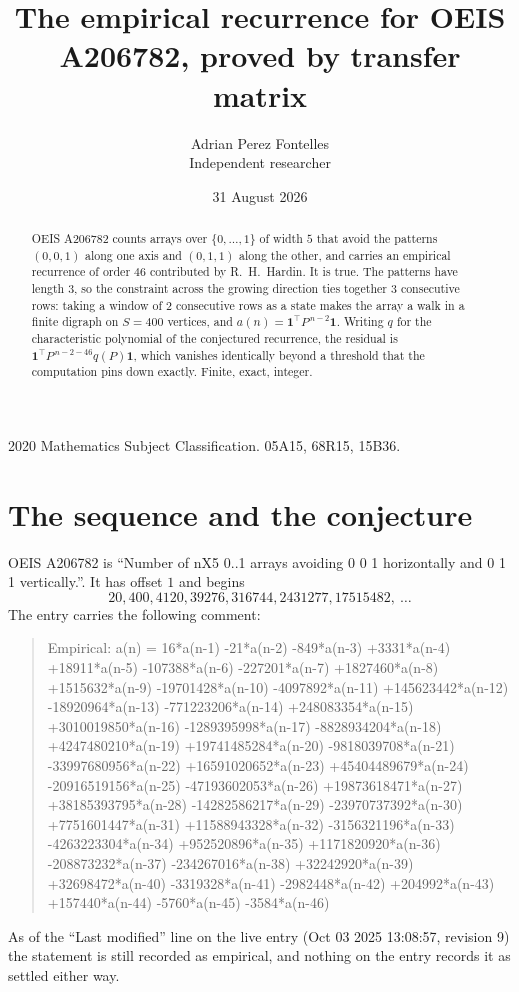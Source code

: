 \documentclass[11pt,a4paper]{article}
\title{The empirical recurrence for OEIS A206782, proved by transfer matrix}
\author{Adrian Perez Fontelles\\ \small Independent researcher}
\date{31 August 2026}
\theoremstyle{plain}
\theoremstyle{definition}
\begin{document}
\maketitle

\begin{abstract}
OEIS A206782 counts arrays over $\{0,\dots,1\}$ of width $5$ that avoid the patterns
$(0,0,1)$ along one axis and $(0,1,1)$ along the other, and carries an empirical recurrence of
order $46$ contributed by R.~H.~Hardin. It is true. The patterns have length $3$, so
the constraint across the growing direction ties together $3$ consecutive rows: taking a
window of $2$ consecutive rows as a state makes the array a walk in a finite digraph
on $S=400$ vertices, and $a(n)=\mathbf{1}^{\!\top}P^{\,n-2}\mathbf{1}$. Writing $q$
for the characteristic polynomial of the conjectured recurrence, the residual is
$\mathbf{1}^{\!\top}P^{\,n-2-46}q(P)\mathbf{1}$, which vanishes identically
beyond a threshold that the computation pins down exactly. Finite, exact, integer.
\end{abstract}

\noindent\small 2020 Mathematics Subject Classification. 05A15, 68R15, 15B36.\normalsize

\section{The sequence and the conjecture}

OEIS A206782 is ``Number of nX5 0..1 arrays avoiding 0 0 1 horizontally and 0 1 1 vertically.''. It has offset
$1$ and begins
\[
20, 400, 4120, 39276, 316744, 2431277, 17515482,\ \dots
\]
The entry carries the following comment:
\begin{quote}\small
Empirical: a(n) = 16*a(n-1) -21*a(n-2) -849*a(n-3) +3331*a(n-4) +18911*a(n-5) -107388*a(n-6) -227201*a(n-7) +1827460*a(n-8) +1515632*a(n-9) -19701428*a(n-10) -4097892*a(n-11) +145623442*a(n-12) -18920964*a(n-13) -771223206*a(n-14) +248083354*a(n-15) +3010019850*a(n-16) -1289395998*a(n-17) -8828934204*a(n-18) +4247480210*a(n-19) +19741485284*a(n-20) -9818039708*a(n-21) -33997680956*a(n-22) +16591020652*a(n-23) +45404489679*a(n-24) -20916519156*a(n-25) -47193602053*a(n-26) +19873618471*a(n-27) +38185393795*a(n-28) -14282586217*a(n-29) -23970737392*a(n-30) +7751601447*a(n-31) +11588943328*a(n-32) -3156321196*a(n-33) -4263223304*a(n-34) +952520896*a(n-35) +1171820920*a(n-36) -208873232*a(n-37) -234267016*a(n-38) +32242920*a(n-39) +32698472*a(n-40) -3319328*a(n-41) -2982448*a(n-42) +204992*a(n-43) +157440*a(n-44) -5760*a(n-45) -3584*a(n-46)
\end{quote}
As of the ``Last modified'' line on the live entry (Oct 03 2025 13:08:57, revision
9) the statement is still recorded as empirical, and nothing on the entry
records it as settled either way.
\end{document}
